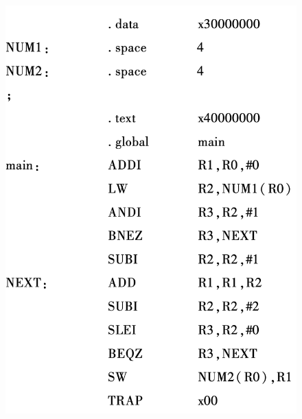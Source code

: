 \documentclass[10pt,a4paper,UTF8]{ctexart}
\begin{document}
\begin{figure}[H]
	\centering
	\includegraphics[scale=0.5]{img/11.10}
\end{figure}
\end{document}
